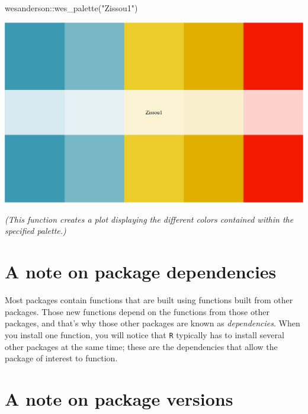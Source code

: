 \documentclass[
]{book}
\newenvironment{Shaded}{\begin{snugshade}}{\end{snugshade}}
\newcommand{\FunctionTok}[1]{\textcolor[rgb]{0.00,0.00,0.00}{#1}}
\newcommand{\NormalTok}[1]{#1}
\newcommand{\SpecialCharTok}[1]{\textcolor[rgb]{0.00,0.00,0.00}{#1}}
\newcommand{\StringTok}[1]{\textcolor[rgb]{0.31,0.60,0.02}{#1}}
\begin{document}
\begin{Shaded}
\begin{Highlighting}[]
\NormalTok{wesanderson}\SpecialCharTok{::}\FunctionTok{wes\_palette}\NormalTok{(}\StringTok{"Zissou1"}\NormalTok{)}
\end{Highlighting}
\end{Shaded}

\includegraphics{figures/unnamed-chunk-132-2.pdf}

\emph{(This function creates a plot displaying the different colors contained within the specified palette.)}

\hypertarget{a-note-on-package-dependencies}{%
\section*{A note on package dependencies}\label{a-note-on-package-dependencies}}

Most packages contain functions that are built using functions built from other packages. Those new functions depend on the functions from those other packages, and that's why those other packages are known as \emph{dependencies}. When you install one function, you will notice that \texttt{R} typically has to install several other packages at the same time; these are the dependencies that allow the package of interest to function.

\hypertarget{a-note-on-package-versions}{%
\section*{A note on package versions}\label{a-note-on-package-versions}}
\end{document}
